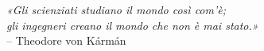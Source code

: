 \vspace{1.5cm} %

\begin{flushright}
	\textit{«Gli scienziati studiano il mondo così com'è; \\ 
		gli ingegneri creano il mondo che non è mai stato.»}\\
	\vspace{0.2cm} %
	-- Theodore von Kármán
\end{flushright}

\nocite{*}